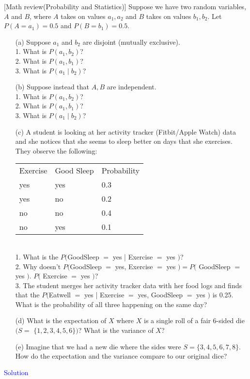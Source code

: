 \item {} [Math review(Probability and Statistics)]
Suppose we have two random variables, $A$ and $B$, where $A$ takes on values $a_1, a_2$ and $B$ takes on values $b_1, b_2$. Let $P\left(A=a_1\right)=0.5$ and $P\left(B=b_1\right)=0.5$.
\begin{itemize}
    \item[(a)] Suppose $a_1$ and $b_2$ are disjoint (mutually exclusive). ~ \\
    1. What is $P\left(a_1, b_2\right)$? \\
    2. What is $P\left(a_1, b_1\right)$? \\
    3. What is $P\left(a_1 \mid b_2\right)$?

    \item[(b)] Suppose instead that $A, B$ are independent. ~ \\
    1. What is $P\left(a_1, b_2\right)$? \\
    2. What is $P\left(a_1, b_1\right)$? \\
    3. What is $P\left(a_1 \mid b_2\right)$?
    \item[(c)] A student is looking at her activity tracker (Fitbit/Apple Watch) data and she notices that she seems to sleep better on days that she exercises. They observe the following: \\
    \begin{tabular}{lll}
    Exercise & Good Sleep & Probability \\
    yes & yes & 0.3 \\
    yes & no & 0.2 \\
    no & no & 0.4 \\
    no & yes & 0.1
    \end{tabular} \\
    1. What is the $P($GoodSleep $=$ yes | Exercise $=$ yes $)$? \\
    2. Why doesn't $P($GoodSleep $=$ yes, Exercise $=$ yes $)=P($ GoodSleep $=$ yes $)$. $P($ Exercise $=$ yes $)$? \\
    3. The student merges her activity tracker data with her food logs and finds that the $P($Eatwell $=$ yes | Exercise $=$ yes, GoodSleep $=$ yes $)$ is 0.25. What is the probability of all three happening on the same day? ~

    \item[(d)] What is the expectation of $X$ where $X$ is a single roll of a fair 6-sided die $(S=$ $\{1,2,3,4,5,6\})$? What is the variance of $X$? ~

    \item[(e)] Imagine that we had a new die where the sides were $S=\{3,4,5,6,7,8\}$. How do the expectation and the variance compare to our original dice? ~
\end{itemize}

\textcolor{blue}{Solution} \\






\newpage